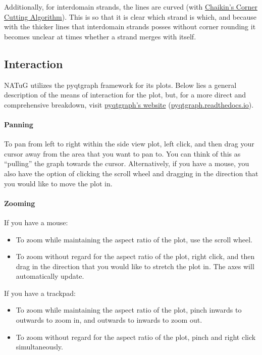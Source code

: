 \documentclass[titlepage]{article}
\begin{document}
	Additionally, for interdomain strands, the lines are curved (with \href{https://www.cs.unc.edu/~dm/UNC/COMP258/LECTURES/Chaikins-Algorithm.pdf}{Chaikin's Corner Cutting Algorithm}). This is so that it is clear which strand is which, and because with the thicker lines that interdomain strands posses without corner rounding it becomes unclear at times whether a strand merges with itself. 
	
	\subsection{Interaction}
	NATuG utilizes the pyqtgraph framework for its plots. Below lies a general description of the means of interaction for the plot, but, for a more direct and comprehensive breakdown, visit \href{https://pyqtgraph.readthedocs.io/en/latest/user_guide/mouse_interaction.html}{pyqtgraph’s website} (\href{https://pyqtgraph.readthedocs.io/en/latest/user_guide/mouse_interaction.html}{pyqtgraph.readthedocs.io}).
	
	\paragraph{Panning}
	To pan from left to right within the side view plot, left click, and then drag your cursor away from the area that you want to pan to. You can think of this as “pulling” the graph towards the cursor. Alternatively, if you have a mouse, you also have the option of clicking the scroll wheel and dragging in the direction that you would like to move the plot in.
	
	\paragraph{Zooming}
	If you have a mouse:
	\begin{itemize}
		\item To zoom while maintaining the aspect ratio of the plot, use the scroll wheel.
		\item To zoom without regard for the aspect ratio of the plot, right click, and then drag in the direction that you would like to stretch the plot in. The axes will automatically update.
	\end{itemize}
	
	If you have a trackpad:
	\begin{itemize}
		\item To zoom while maintaining the aspect ratio of the plot, pinch inwards to outwards to zoom in, and outwards to inwards to zoom out.
		\item To zoom without regard for the aspect ratio of the plot, pinch and right click simultaneously. 
	\end{itemize}
\end{document}

